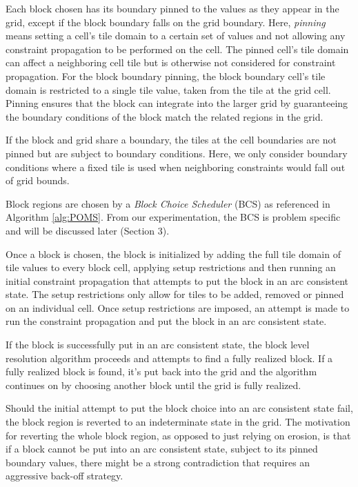 Each block chosen has its boundary pinned to the values as they appear in the grid,
except if the block boundary falls on the grid boundary.
Here, \textit{pinning} means setting a cell's tile domain to a certain set of values
and not allowing any constraint propagation to be performed on the cell.
The pinned cell's tile domain can affect a neighboring cell tile but is otherwise not
considered for constraint propagation.
For the block boundary pinning, the block boundary cell's tile domain is restricted to a single tile value,
taken from the tile at the grid cell.
Pinning ensures that the block can integrate into the larger grid by guaranteeing
the boundary conditions of the block match the related regions in the grid.

If the block and grid share a boundary, the tiles at the cell boundaries are not
pinned but are subject to boundary conditions.
Here, we only consider boundary conditions where a fixed tile is used when neighboring
constraints would fall out of grid bounds.

Block regions are chosen by a \textit{Block Choice Scheduler} (BCS) as referenced in Algorithm \ref{alg:POMS}.
From our experimentation, the BCS is problem specific and will be discussed later (Section 3).

Once a block is chosen, the block is initialized by adding the full tile domain of tile values
to every block cell, applying setup restrictions and then running an initial constraint propagation
that attempts to put the block in an arc consistent state.
The setup restrictions only allow for tiles to be added, removed
or pinned on an individual cell.
Once setup restrictions are imposed, an attempt is made to run the constraint propagation and
put the block in an arc consistent state.

If the block is successfully put in an arc consistent state, the block level resolution algorithm proceeds and attempts to find a fully realized block.
If a fully realized block is found, it's put back into the grid and the algorithm
continues on by choosing another block until the grid is fully realized.

Should the initial attempt to put the block choice into an arc consistent state fail,
the block region is reverted to an indeterminate state in the grid.
The motivation for reverting the whole block region, as opposed to just relying on erosion,
is that if a block cannot be put into an arc consistent state, subject to its pinned
boundary values, there might be a strong contradiction that requires an aggressive
back-off strategy.

